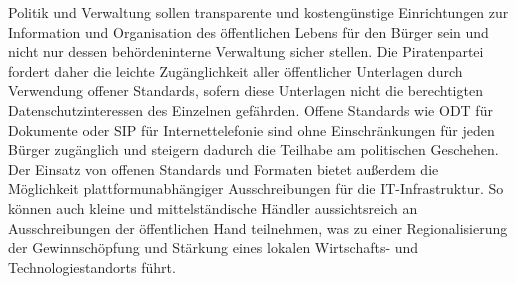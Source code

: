   Politik und Verwaltung sollen transparente und kostengünstige Einrichtungen 
  zur Information und Organisation des öffentlichen Lebens für den Bürger sein 
  und nicht nur dessen behördeninterne Verwaltung sicher stellen. Die 
  Piratenpartei fordert daher die leichte Zugänglichkeit aller öffentlicher 
  Unterlagen durch Verwendung offener Standards, sofern diese Unterlagen nicht 
  die berechtigten Datenschutzinteressen des Einzelnen gefährden. Offene 
  Standards wie ODT für Dokumente oder SIP für Internettelefonie sind ohne 
  Einschränkungen für jeden Bürger zugänglich und steigern dadurch die 
  Teilhabe am politischen Geschehen. Der Einsatz von offenen Standards und 
  Formaten bietet außerdem die Möglichkeit plattformunabhängiger 
  Ausschreibungen für die IT-Infrastruktur. So können auch kleine und 
  mittelständische Händler aussichtsreich an Ausschreibungen der öffentlichen 
  Hand teilnehmen, was zu einer Regionalisierung der Gewinnschöpfung und 
  Stärkung eines lokalen Wirtschafts- und Technologiestandorts führt.